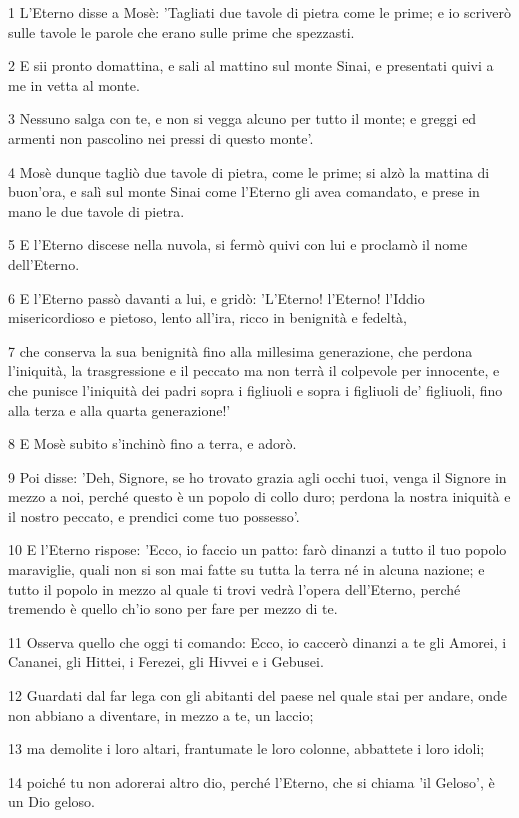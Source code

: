 \par 1 L'Eterno disse a Mosè: 'Tagliati due tavole di pietra come le prime; e io scriverò sulle tavole le parole che erano sulle prime che spezzasti.
\par 2 E sii pronto domattina, e sali al mattino sul monte Sinai, e presentati quivi a me in vetta al monte.
\par 3 Nessuno salga con te, e non si vegga alcuno per tutto il monte; e greggi ed armenti non pascolino nei pressi di questo monte'.
\par 4 Mosè dunque tagliò due tavole di pietra, come le prime; si alzò la mattina di buon'ora, e salì sul monte Sinai come l'Eterno gli avea comandato, e prese in mano le due tavole di pietra.
\par 5 E l'Eterno discese nella nuvola, si fermò quivi con lui e proclamò il nome dell'Eterno.
\par 6 E l'Eterno passò davanti a lui, e gridò: 'L'Eterno! l'Eterno! l'Iddio misericordioso e pietoso, lento all'ira, ricco in benignità e fedeltà,
\par 7 che conserva la sua benignità fino alla millesima generazione, che perdona l'iniquità, la trasgressione e il peccato ma non terrà il colpevole per innocente, e che punisce l'iniquità dei padri sopra i figliuoli e sopra i figliuoli de' figliuoli, fino alla terza e alla quarta generazione!'
\par 8 E Mosè subito s'inchinò fino a terra, e adorò.
\par 9 Poi disse: 'Deh, Signore, se ho trovato grazia agli occhi tuoi, venga il Signore in mezzo a noi, perché questo è un popolo di collo duro; perdona la nostra iniquità e il nostro peccato, e prendici come tuo possesso'.
\par 10 E l'Eterno rispose: 'Ecco, io faccio un patto: farò dinanzi a tutto il tuo popolo maraviglie, quali non si son mai fatte su tutta la terra né in alcuna nazione; e tutto il popolo in mezzo al quale ti trovi vedrà l'opera dell'Eterno, perché tremendo è quello ch'io sono per fare per mezzo di te.
\par 11 Osserva quello che oggi ti comando: Ecco, io caccerò dinanzi a te gli Amorei, i Cananei, gli Hittei, i Ferezei, gli Hivvei e i Gebusei.
\par 12 Guardati dal far lega con gli abitanti del paese nel quale stai per andare, onde non abbiano a diventare, in mezzo a te, un laccio;
\par 13 ma demolite i loro altari, frantumate le loro colonne, abbattete i loro idoli;
\par 14 poiché tu non adorerai altro dio, perché l'Eterno, che si chiama 'il Geloso', è un Dio geloso.
